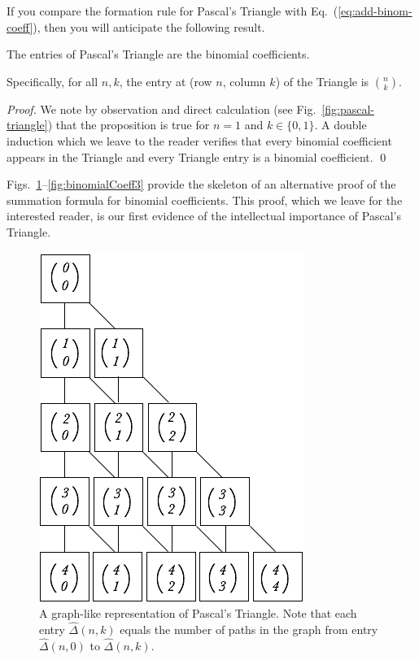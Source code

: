 
\medskip

If you compare the formation rule for Pascal's Triangle with Eq.~(\ref{eq:add-binom-coeff}), then you will anticipate the following result.

\begin{prop}
\label{thm:pascal-binom}
The entries of Pascal's Triangle are the binomial coefficients.

\smallskip

\noindent
Specifically, for all $n,k$, the entry at (row $n$, column $k$) of the Triangle is $\displaystyle {n \choose k}$.
\end{prop}

\begin{proof}
We note by observation and direct calculation (see Fig.~\ref{fig:pascal-triangle}) that the proposition is true for $n = 1$ and $k \in \{0, 1\}$.  A double induction which we leave to the reader verifies that every binomial coefficient appears in the Triangle and every Triangle entry is a binomial coefficient.  \qed
\end{proof}

\medskip

Figs.~\ref{fig:binomialCoeff1}--\ref{fig:binomialCoeff3} provide the skeleton of an alternative proof of the summation formula for binomial coefficients.  This proof, which we leave for the interested reader, is our first evidence of the intellectual importance of Pascal's Triangle.
\begin{figure}[htb]
\begin{center}
       \includegraphics[scale=0.4]{FiguresMaths/CoeffBinomiaux1}
\caption{A graph-like representation of Pascal's Triangle.  Note that each entry $\hat{\Delta}(n, k)$ equals the number of paths in the graph from entry $\hat{\Delta}(n, 0)$ to $\hat{\Delta}(n, k)$.}
\label{fig:binomialCoeff1}
\end{center}
\end{figure}

